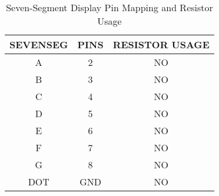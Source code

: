\begin{table}[h]
    \centering
    \renewcommand{\arraystretch}{1.3}
    \begin{tabular}{|c|c|c|}
        \hline
        \textbf{SEVENSEG} & \textbf{PINS} & \textbf{RESISTOR USAGE} \\
        \hline
        A& 2 & NO\\
        B& 3& NO\\
        C& 4& NO\\
        D& 5& NO\\
        E& 6& NO\\
        F& 7& NO\\
        G& 8& NO\\
        DOT& GND & NO\\
        \hline
    \end{tabular}
    \caption{Seven-Segment Display Pin Mapping and Resistor Usage}
    \label{tab:sevenseg}
\end{table}

